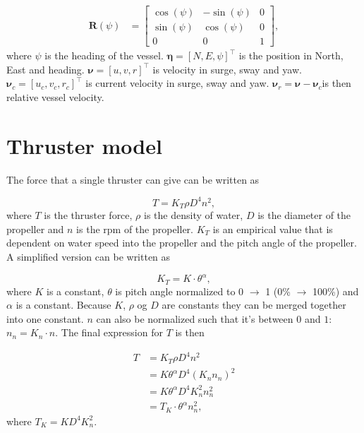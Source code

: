 \documentclass[a4paper]{article}
\begin{document}
\begin{equation}
\label{eq:rotation_matrix}
\begin{aligned}
	\boldsymbol{R}(\psi) &=
		\left[ \begin{array}{ccc}
			\cos(\psi) &  -\sin(\psi) & 0 \\
			\sin(\psi) &  \cos(\psi) & 0 \\
			0 & 0 &  1 
		\end{array} \right],
\end{aligned}
\end{equation}
%
where $\psi$ is the heading of the vessel. $\boldsymbol{\eta} = [N, E, \psi]^{\top}$ is the position in North, East and heading. $\boldsymbol{\nu} = [u, v, r]^{\top}$ 
is velocity in surge, sway and yaw. $\boldsymbol{\nu}_c = [u_c, v_c, r_c]^{\top}$ is current velocity in surge, sway and yaw. 
$\boldsymbol{\nu}_r = \boldsymbol{\nu} - \boldsymbol{\nu}_c$is then relative vessel velocity.


\section{Thruster model}

The force that a single thruster can give can be written as

\begin{equation}
	T = K_T \rho D^4 n^2,
\end{equation}
%
where $T$ is the thruster force, $\rho$ is the density of water, $D$ is the diameter of the propeller and $n$ is the rpm of the propeller. $K_T$ is an empirical value that is
dependent on water speed into the propeller and the pitch angle of the propeller. A simplified version can be written as

\begin{equation}
	K_T = K \cdot \theta^\alpha,
\end{equation}
%
where $K$ is a constant, $\theta$ is pitch angle normalized to 0 $\rightarrow$ 1 (0\% $\rightarrow$ 100\%) and $\alpha$ is a constant. Because $K$, $\rho$ og $D$ are constants
they can be merged together into one constant. $n$ can also be normalized such that it's between $0$ and $1$: $n_n = K_n \cdot n$. The final expression for $T$ is then

\begin{equation}
\begin{aligned}
	T &= K_T \rho D^4 n^2 \\
	   &= K \theta^\alpha D^4 (K_n n_n)^2 \\
	   &= K \theta^\alpha D^4 K_n^2 n_n^2 \\
	   &= T_{K} \cdot \theta^\alpha n_n^2,
\end{aligned}
\end{equation}
%
where $T_{K} = K D^4 K_n^2$.
\end{document}
